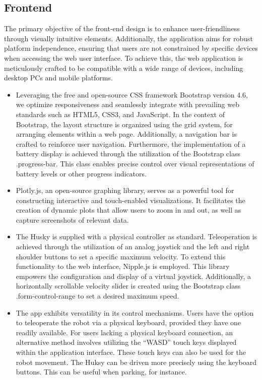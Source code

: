 \documentclass[conference]{IEEEtran}
\begin{document}
\subsection{Frontend}
The primary objective of the front-end design is to enhance user-friendliness through visually intuitive elements. Additionally, the application aims for robust platform independence, ensuring that users are not constrained by specific devices when accessing the web user interface. 
To achieve this, the web application is meticulously crafted to be compatible with a wide range of devices, including desktop PCs and mobile platforms. 
\begin{itemize}
\item Leveraging the free and open-source CSS framework Bootstrap version 4.6, we optimize responsiveness and seamlessly integrate with prevailing web standards such as HTML5, CSS3, and JavaScript. 
In the context of Bootstrap, the layout structure is organized using the grid system, for arranging elements within a web page. 
Additionally, a navigation bar is crafted to reinforce user navigation.
Furthermore, the implementation of a battery display is achieved through the utilization of the Bootstrap class .progress-bar. 
This class enables precise control over visual representations of battery levels or other progress indicators.
\item Plotly.js, an open-source graphing library, serves as a powerful tool for constructing interactive and touch-enabled visualizations. It facilitates the creation of dynamic plots that allow users to zoom in and out, as well as capture screenshots of relevant data.
\item The Husky is supplied with a physical controller as standard. Teleoperation is achieved through the utilization of an analog joystick and the left and right shoulder buttons to set a specific maximum velocity.
To extend this functionality to the web interface, Nipple.js is employed. This library empowers the configuration and display of a virtual joystick. Additionally, a horizontally scrollable velocity slider is created using the Bootstrap class .form-control-range to set a desired maximum speed.
\item The app exhibits versatility in its control mechanisms. Users have the option to teleoperate the robot via a physical keyboard, provided they have one readily available. For users lacking a physical keyboard connection, an alternative method involves utilizing the “WASD” touch keys displayed within the application interface. 
These touch keys can also be used for the robot movement. The Huksy can be driven more precisely using the keyboard buttons. This can be useful when parking, for instance.

\end{itemize}
\end{document}
